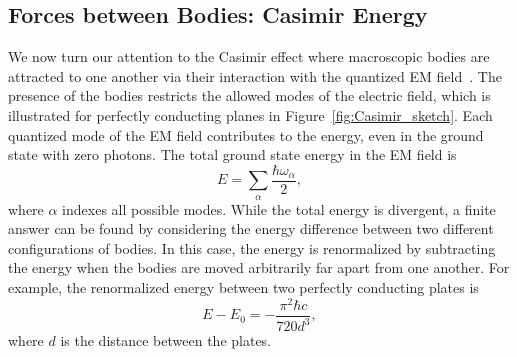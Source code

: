 

\subsection{Forces between Bodies: Casimir Energy}

We now turn our attention to the Casimir effect where macroscopic bodies are attracted to 
one another via their interaction with the quantized EM field~\citep{Casimir1948}.  
The presence of the bodies restricts the allowed modes of the electric field, 
which is illustrated for perfectly conducting planes in Figure~\ref{fig:Casimir_sketch}.
Each quantized mode of the EM field contributes
to the energy, even in the ground state with zero photons.
The total ground state energy in the EM field is 
\begin{equation}
  E=\sum_\alpha\frac{\hbar\omega_{\alpha}}{2},
\end{equation}
where $\alpha$ indexes all possible modes.  
While the total energy is divergent, a finite answer can be found by considering 
the energy difference between two different configurations of bodies.  
In this case, the energy is renormalized by subtracting the energy when the bodies are moved arbitrarily far apart
from one another.  
For example, the renormalized energy between two perfectly conducting plates is
\begin{equation}
  E-E_0 = -\frac{\pi^2\hbar c}{720 d^3},\label{eq:Casimir_energy}
\end{equation}
where $d$ is the distance between the plates.  %


